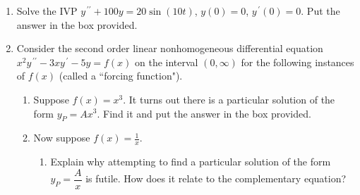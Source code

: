 \documentclass{ximera}
\begin{document}
\begin{enumerate}
\begin{enumerate}
\item $y^{\,\prime\prime\prime}-3y^{\,\prime\prime}+3y^{\,\prime}-y=(1+t^2)e^t$.\\
\vfill

\end{enumerate}

\newpage

\item Solve the IVP $y^{\,\prime\prime}+100y=20\sin{(10t)}$, $y(0)=0$, $y^{\,\prime}(0)=0$. Put the answer in the box provided.
    
    


\hfill{}\fbox{ \begin{minipage}{4in}\vspace{0.25in} \hfill\vspace{0.25in} \end{minipage} }

\newpage


\item Consider the second order linear nonhomogeneous differential equation $x^2y^{\,\prime\prime}-3xy^{\,\prime}-5y=f(x)$ on the interval $(0,\infty)$ for the following instances of $f(x)$ (called a ``forcing function").

\begin{enumerate}
\item  Suppose $f(x)=x^3$.  It turns out there is a particular solution of the form $y_P=Ax^3$.   Find it and put the answer in the box provided.


\hfill{}\fbox{ \begin{minipage}{4in}\vspace{0.25in} \hfill\vspace{0.25in} \end{minipage} }

\vfill



\item  Now suppose $f(x)=\displaystyle \frac{1}{x}$.

\begin{enumerate}

\item Explain why attempting to find a particular solution of the form $y_P=\dfrac{A}{x}$ is futile.  How does it relate to the complementary equation?


\end{enumerate}
\end{enumerate}
\end{enumerate}
\end{document}
